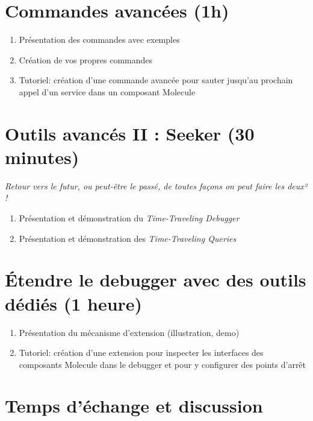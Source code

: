 \documentclass[manuscript, language=english, language=french, nonacm]{acmart}
\begin{document}
\section{Commandes avancées (1h)}

\begin{enumerate}
    \item Présentation des commandes avec exemples
    \item Création de vos propres commandes
    \item Tutoriel: création d'une commande avancée pour sauter jusqu'au prochain appel d'un service dans un composant Molecule
\end{enumerate}


\section{Outils avancés II : Seeker (30 minutes)}

\textit{Retour vers le futur, ou peut-être le passé, de toutes façons on peut faire les deux² !}

\begin{enumerate}
    \item Présentation et démonstration du \textit{Time-Traveling Debugger}
    \item Présentation et démonstration des \textit{Time-Traveling Queries}
\end{enumerate}


\section{Étendre le debugger avec des outils dédiés (1 heure)}

\begin{enumerate}
    \item Présentation du mécanisme d'extension (illustration, demo)
    \item Tutoriel: création d'une extension pour inspecter les interfaces des composants Molecule dans le debugger et pour y configurer des points d'arrêt
\end{enumerate}


\section{Temps d'échange et discussion}
\end{document}
